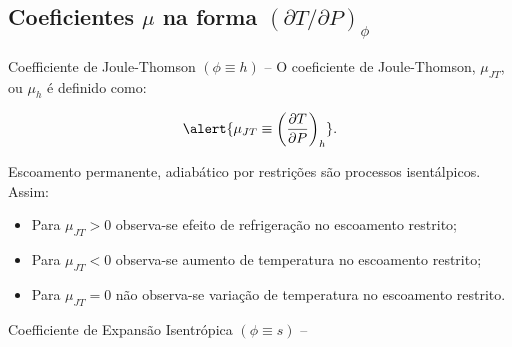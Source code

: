 \subsection{Coeficientes $\mu$ na forma $(\partial T/\partial P)_{\phi}$}

    \begin{frame}[allowframebreaks]{Coefficiente de Joule-Thomson $(\phi \equiv h)$ --}
        O coeficiente de Joule-Thomson, \alert{$\mu_{JT}$}, ou $\mu_h$ é definido como:

        \begin{equation*}
            \alert{
                \mu_{JT} \equiv \left(\frac{\partial T}{\partial P}\right)_h
            }.
        \end{equation*} \vspace*\medskipamount

        Escoamento \alert{permanente}, \alert{adiabático} por \alert{restrições} são processos
        \alert{isentálpicos}. Assim: \vspace*\medskipamount

        \begin{itemize}
            \item Para \alert{$\mu_{JT} > 0$} observa-se efeito de \alert{refrigeração} no
                escoamento restrito;
            \item Para \alert{$\mu_{JT} < 0$} observa-se \alert{aumento de temperatura} no
                escoamento restrito;
            \item Para \alert{$\mu_{JT} = 0$} não observa-se \alert{variação de temperatura} no
                escoamento restrito.
        \end{itemize}

    \end{frame}

    \begin{frame}[allowframebreaks]{Coefficiente de Expansão Isentrópica $(\phi \equiv s)$ --}
    \end{frame}

